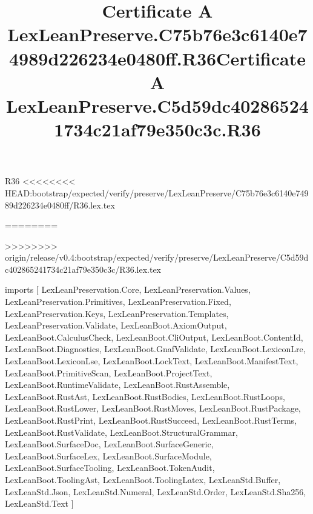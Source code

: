 \begin{lexlean}{R36}
<<<<<<<< HEAD:bootstrap/expected/verify/preserve/LexLeanPreserve/C75b76e3c6140e74989d226234e0480ff/R36.lex.tex
\title{Certificate A LexLeanPreserve.C75b76e3c6140e74989d226234e0480ff.R36}
========
\title{Certificate A LexLeanPreserve.C5d59dc402865241734c21af79e350c3c.R36}
>>>>>>>> origin/release/v0.4:bootstrap/expected/verify/preserve/LexLeanPreserve/C5d59dc402865241734c21af79e350c3c/R36.lex.tex
\begin{coremodule}
imports [
  LexLeanPreservation.Core,
  LexLeanPreservation.Values,
  LexLeanPreservation.Primitives,
  LexLeanPreservation.Fixed,
  LexLeanPreservation.Keys,
  LexLeanPreservation.Templates,
  LexLeanPreservation.Validate,
  LexLeanBoot.AxiomOutput,
  LexLeanBoot.CalculusCheck,
  LexLeanBoot.CliOutput,
  LexLeanBoot.ContentId,
  LexLeanBoot.Diagnostics,
  LexLeanBoot.GnafValidate,
  LexLeanBoot.LexiconLre,
  LexLeanBoot.LexiconLse,
  LexLeanBoot.LockText,
  LexLeanBoot.ManifestText,
  LexLeanBoot.PrimitiveScan,
  LexLeanBoot.ProjectText,
  LexLeanBoot.RuntimeValidate,
  LexLeanBoot.RustAssemble,
  LexLeanBoot.RustAst,
  LexLeanBoot.RustBodies,
  LexLeanBoot.RustLoops,
  LexLeanBoot.RustLower,
  LexLeanBoot.RustMoves,
  LexLeanBoot.RustPackage,
  LexLeanBoot.RustPrint,
  LexLeanBoot.RustSucceed,
  LexLeanBoot.RustTerms,
  LexLeanBoot.RustValidate,
  LexLeanBoot.StructuralGrammar,
  LexLeanBoot.SurfaceDoc,
  LexLeanBoot.SurfaceGeneric,
  LexLeanBoot.SurfaceLex,
  LexLeanBoot.SurfaceModule,
  LexLeanBoot.SurfaceTooling,
  LexLeanBoot.TokenAudit,
  LexLeanBoot.ToolingAst,
  LexLeanBoot.ToolingLatex,
  LexLeanStd.Buffer,
  LexLeanStd.Json,
  LexLeanStd.Numeral,
  LexLeanStd.Order,
  LexLeanStd.Sha256,
  LexLeanStd.Text
]


\end{coremodule}
\end{lexlean}
